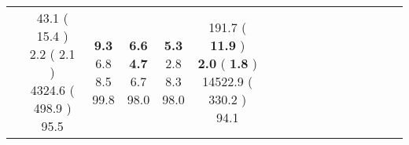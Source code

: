 \documentclass[9pt]{article}
\begin{document}
\begin{landscape}
\begin{longtable}{ l | c c c c | c c c c | c c c c | c c c c |}
 &
                    
                            \makecell{              43.1
     (             15.4
    ) \\
            {\footnotesize             2.2
     (              2.1
     )} \\
            {\footnotesize             4324.6
     (            498.9
    ) } \\
            {\small  \textcolor[rgb]{ 0.29 , 0.61 , 0.1} {95.5  }
} }


             &
                            \makecell{              \textbf{ 9.3 }
     \\
            {\footnotesize             6.8
    } \\  {\footnotesize             8.5
     } \\
            {\small \textcolor[rgb]{ 0.204 , 0.696 , 0.1} {99.8  }
} }
             &                         \makecell{              \textbf{ 6.6 }
     \\
            {\footnotesize             \textbf{ 4.7 }
    } \\  {\footnotesize             6.7
     } \\
            {\small \textcolor[rgb]{ 0.24 , 0.66 , 0.1} {98.0  }
} }
             &
                            \makecell{              \textbf{ 5.3 }
     \\
            {\footnotesize             2.8
    } \\  {\footnotesize             8.3
     } \\
            {\small \textcolor[rgb]{ 0.24 , 0.66 , 0.1} {98.0  }
} }
            

 & 
                            \makecell{              191.7
     (             \textbf{ 11.9 }
    ) \\
            {\footnotesize             \textbf{ 2.0 }
     (              \textbf{ 1.8 }
     )} \\
            {\footnotesize             14522.9
     (            330.2
    ) } \\
            {\small  \textcolor[rgb]{ 0.318 , 0.583 , 0.1} {94.1  }
} }



\end{longtable}
\end{landscape}
\end{document}
